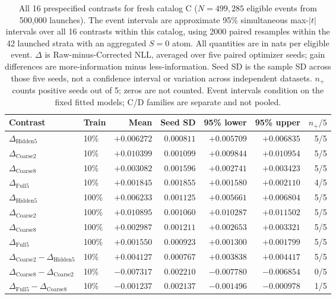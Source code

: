 \begin{table}[!htbp]
\centering
\small
\setlength{\tabcolsep}{3pt}
\caption{All 16 prespecified contrasts for fresh catalog C ($N=499,285$ eligible events from 500,000 launches). The event intervals are approximate 95\% simultaneous max-$|t|$ intervals over all 16 contrasts within this catalog, using 2000 paired resamples within the 42 launched strata with an aggregated $S=0$ atom. All quantities are in nats per eligible event. $\Delta$ is Raw-minus-Corrected NLL, averaged over five paired optimizer seeds; gain differences are more-information minus less-information. Seed SD is the sample SD across those five seeds, not a confidence interval or variation across independent datasets. $n_+$ counts positive seeds out of 5; zeros are not counted. Event intervals condition on the fixed fitted models; C/D families are separate and not pooled.}
\label{tab:information-C-primary16}
\begin{tabular}{llrrrrr}
\toprule
Contrast & Train & Mean & Seed SD & 95\% lower & 95\% upper & $n_+/5$ \\
\midrule
$\Delta_{\mathrm{Hidden5}}$ & 10\% & $+0.006272$ & $0.000811$ & $+0.005709$ & $+0.006835$ & 5/5 \\
$\Delta_{\mathrm{Coarse2}}$ & 10\% & $+0.010399$ & $0.001099$ & $+0.009844$ & $+0.010954$ & 5/5 \\
$\Delta_{\mathrm{Coarse8}}$ & 10\% & $+0.003082$ & $0.001596$ & $+0.002741$ & $+0.003423$ & 5/5 \\
$\Delta_{\mathrm{Full5}}$ & 10\% & $+0.001845$ & $0.001855$ & $+0.001580$ & $+0.002110$ & 4/5 \\
\midrule
$\Delta_{\mathrm{Hidden5}}$ & 100\% & $+0.006233$ & $0.001125$ & $+0.005661$ & $+0.006804$ & 5/5 \\
$\Delta_{\mathrm{Coarse2}}$ & 100\% & $+0.010895$ & $0.001060$ & $+0.010287$ & $+0.011502$ & 5/5 \\
$\Delta_{\mathrm{Coarse8}}$ & 100\% & $+0.002987$ & $0.001211$ & $+0.002653$ & $+0.003321$ & 5/5 \\
$\Delta_{\mathrm{Full5}}$ & 100\% & $+0.001550$ & $0.000923$ & $+0.001300$ & $+0.001799$ & 5/5 \\
\midrule
$\Delta_{\mathrm{Coarse2}}-\Delta_{\mathrm{Hidden5}}$ & 10\% & $+0.004127$ & $0.000767$ & $+0.003838$ & $+0.004417$ & 5/5 \\
$\Delta_{\mathrm{Coarse8}}-\Delta_{\mathrm{Coarse2}}$ & 10\% & $-0.007317$ & $0.002210$ & $-0.007780$ & $-0.006854$ & 0/5 \\
$\Delta_{\mathrm{Full5}}-\Delta_{\mathrm{Coarse8}}$ & 10\% & $-0.001237$ & $0.002137$ & $-0.001496$ & $-0.000978$ & 1/5 \\

\end{tabular}
\end{table}
